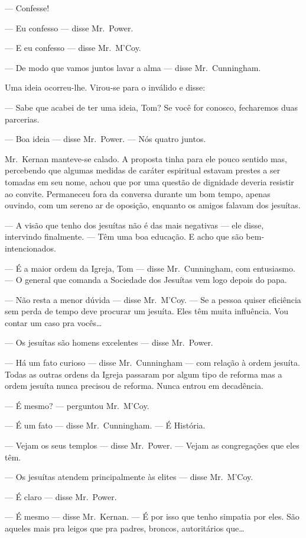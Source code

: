 --- Confesse!

--- Eu confesso --- disse Mr.~Power.

--- E eu confesso --- disse Mr.~M’Coy.

--- De modo que vamos juntos lavar a alma --- disse Mr.~Cunningham.

Uma ideia ocorreu-lhe.  Virou-se para o inválido e disse:

--- Sabe que acabei de ter uma ideia, Tom?  Se você for conosco, fecharemos
duas parcerias.

--- Boa ideia --- disse Mr.~Power.  --- Nós quatro juntos.  

Mr.~Kernan manteve-se calado.  A proposta tinha para ele pouco sentido mas,
percebendo que algumas medidas de caráter espiritual estavam prestes a ser
tomadas em seu nome, achou que por uma questão de dignidade deveria resistir ao
convite.  Permaneceu fora da conversa durante um bom tempo, apenas ouvindo, com
um sereno ar de oposição, enquanto os amigos falavam dos jesuítas.

--- A visão que tenho dos jesuítas não é das mais negativas --- ele disse,
intervindo finalmente.  --- Têm uma boa educação.  E acho que são
bem-intencionados.

--- É a maior ordem da Igreja, Tom --- disse Mr.~Cunningham, com
entusiasmo.  --- O general que comanda a Sociedade dos Jesuítas vem logo depois
do papa.

--- Não resta a menor dúvida --- disse Mr.~M’Coy.  --- Se a pessoa quiser
eficiência sem perda de tempo deve procurar um jesuíta.  Eles têm muita
influência.  Vou contar um caso pra vocês\ldots{}

--- Os jesuítas são homens excelentes --- disse Mr.~Power.

--- Há um fato curioso --- disse Mr.~Cunningham --- com relação à ordem
jesuíta.  Todas as outras ordens da Igreja passaram por algum tipo de reforma
mas a ordem jesuíta nunca precisou de reforma.  Nunca entrou em decadência.

--- É mesmo? --- perguntou Mr.~M’Coy.

--- É um fato --- disse Mr.~Cunningham.  --- É História.

--- Vejam os seus templos --- disse Mr.~Power.  --- Vejam as congregações que
eles têm.

--- Os jesuítas atendem principalmente às elites --- disse Mr.~M’Coy.

--- É claro --- disse Mr.~Power.

--- É mesmo --- disse Mr.~Kernan.  --- É por isso que tenho simpatia por
eles.  São aqueles mais pra leigos que pra padres, broncos, autoritários
que\ldots{}

